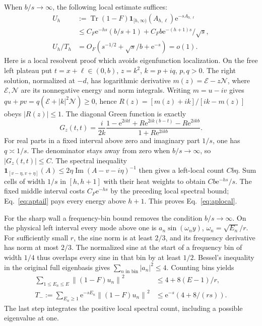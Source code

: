 \documentclass[aps,pra,reprint,superscriptaddress,longbibliography]{revtex4-2}
\newcommand{\Tr}{\operatorname{Tr}}
\newcommand{\ee}{\mathrm e}
\newcommand{\norm}[1]{\left\lVert#1\right\rVert}
\newcommand{\one}{\mathbf 1}
\begin{document}
When $b/s\to\infty$, the following local estimate suffices:
\begin{align}
 U_h&:=\Tr(1-F)\one_{[h,\infty)}(A_{h,\ell})\ee^{-sA_{h,\ell}}
 \nonumber\\
 &\le C_F\ee^{-hs}(b/s+1)+C_Fb\ee^{-(h+1)s}/\sqrt s,\nonumber\\
 U_h/T_h&=O_F(s^{-1/2}+\sqrt s/b+\ee^{-s})=o(1).         \label{eq:aplocal}
\end{align}
Here is a local resolvent proof which avoids eigenfunction localization.
On the free left plateau put $t=x+\ell\in(0,b)$, $z=k^2$, $k=p+iq$,
$p,q>0$. The right solution, normalized at $-d$, has logarithmic
derivative $m(z)=\mathcal E-z\mathcal N$, where $\mathcal E,\mathcal N$
are its nonnegative energy and norm integrals. Writing $m=u-iv$ gives
$qu+pv=q(\mathcal E+|k|^2\mathcal N)\ge0$, hence
$R(z)=[m(z)+ik]/[ik-m(z)]$ obeys $|R(z)|\le1$. The diagonal Green
function is exactly
\begin{equation}
 G_z(t,t)=\frac{i}{2k}
 \frac{1-\ee^{2ikt}+R\ee^{2ik(b-t)}-R\ee^{2ikb}}
      {1+R\ee^{2ikb}}.                                  \label{eq:apgreen}
\end{equation}
For real parts in a fixed interval above zero and imaginary part
$1/s$, one has $q\asymp1/s$. The denominator stays away from zero
when $b/s\to\infty$, so $|G_z(t,t)|\le C$. The spectral inequality
$\one_{[v-\eta,v+\eta]}(A)\le2\eta\operatorname{Im}(A-v-i\eta)^{-1}$
then gives a left-local count $Cb\eta$. Sum cells of width $1/s$ in
$[h,h+1]$ with their heat weights to obtain $Cb\ee^{-hs}/s$.
The fixed middle interval costs $C_F\ee^{-hs}$ by the preceding
local spectral bound; Eq.~\eqref{eq:aptail} pays every energy above
$h+1$. This proves Eq.~\eqref{eq:aplocal}.

For the sharp wall a frequency-bin bound removes the condition
$b/s\to\infty$. On the physical left interval every mode above one
is $a_n\sin(\omega_n y)$, $\omega_n=\sqrt{E_n}/r$. For sufficiently
small $r$, the sine norm is at least $2/3$, and its frequency derivative
has norm at most $2/3$. The normalized sine at the start of a frequency
bin of width $1/4$ thus overlaps every sine in that bin by at least
$1/2$. Bessel's inequality in the original full eigenbasis gives
$\sum_{n\text{ in bin}}|a_n|^2\le4$. Counting bins yields
\begin{align}
 \sum_{1\le E_n\le E}\norm{(1-F)u_n}^2&\le4+8(E-1)/r,\nonumber\\
 T_-:=\sum_{E_n\ge1}\ee^{-sE_n}\norm{(1-F)u_n}^2
                    &\le\ee^{-s}(4+8/(rs)).              \label{eq:apsharpactivated}
\end{align}
The last step integrates the positive local spectral count, including
a possible eigenvalue at one.
\end{document}
